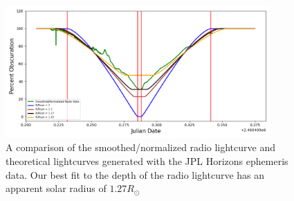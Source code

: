 

\begin{figure}[h!]
  \includegraphics[width=0.9\textwidth]{figures/RadiovsTheoretical}
  \caption{\label{fig:RadiovsTheoretical} A comparison of the smoothed/normalized radio lightcurve and theoretical lightcurves generated with the JPL Horizons ephemeris data. Our best fit to the depth of the radio lightcurve has an apparent solar radius of $1.27 R_{\odot}$}
\end{figure}

